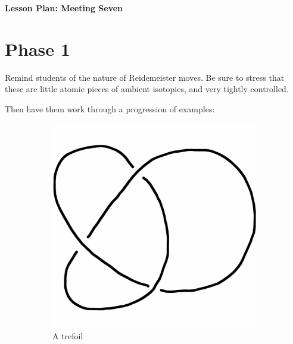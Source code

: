 \documentclass[12pt]{amsart}
\theoremstyle{definition}
\begin{document}
\begin{center}
\textbf{\Huge
Lesson Plan: Meeting Seven
}
\end{center}
\vspace{.5in}

\section*{Phase 1} Remind students of the nature of Reidemeister moves. Be sure to stress that these are little atomic pieces of ambient isotopies, and very tightly controlled.

Then have them work through a progression of examples:

\begin{figure}[h]
        \centering
        \begin{subfigure}[b]{0.3\textwidth}
                \includegraphics[width=\textwidth]{knotpics/trefoil.png}
                \caption{A trefoil}
        \end{subfigure}
        \begin{subfigure}[b]{0.3\textwidth}

\end{subfigure}
\end{figure}
\end{document}
